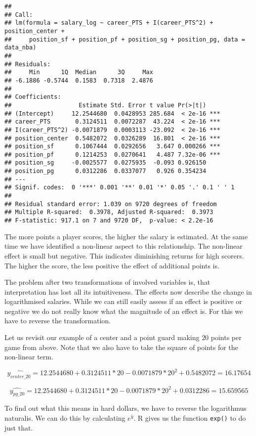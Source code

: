 \documentclass[
]{book}
\begin{document}
\begin{verbatim}
## 
## Call:
## lm(formula = salary_log ~ career_PTS + I(career_PTS^2) + position_center + 
##     position_sf + position_pf + position_sg + position_pg, data = data_nba)
## 
## Residuals:
##     Min      1Q  Median      3Q     Max 
## -6.1886 -0.5744  0.1583  0.7318  2.4876 
## 
## Coefficients:
##                   Estimate Std. Error t value Pr(>|t|)    
## (Intercept)     12.2544680  0.0428953 285.684  < 2e-16 ***
## career_PTS       0.3124511  0.0072287  43.224  < 2e-16 ***
## I(career_PTS^2) -0.0071879  0.0003113 -23.092  < 2e-16 ***
## position_center  0.5482072  0.0326289  16.801  < 2e-16 ***
## position_sf      0.1067444  0.0292656   3.647 0.000266 ***
## position_pf      0.1214253  0.0270641   4.487 7.32e-06 ***
## position_sg     -0.0025577  0.0275935  -0.093 0.926150    
## position_pg      0.0312286  0.0337077   0.926 0.354234    
## ---
## Signif. codes:  0 '***' 0.001 '**' 0.01 '*' 0.05 '.' 0.1 ' ' 1
## 
## Residual standard error: 1.039 on 9720 degrees of freedom
## Multiple R-squared:  0.3978, Adjusted R-squared:  0.3973 
## F-statistic: 917.1 on 7 and 9720 DF,  p-value: < 2.2e-16
\end{verbatim}

The more points a player scores, the higher the salary is estimated. At the same
time we have identified a non-linear aspect to this relationship. The non-linear
effect is small but negative. This indicates diminishing returns for high
scorers. The higher the score, the less positive the effect of additional points
is.

The problem after two transformations of involved variables is, that
interpretation has lost all its intuitiveness. The effects now describe the
change in logarithmised salaries. While we can still easily assess if an effect
is positive or negative we do not really know what the magnitude of an effect is.
For this we have to reverse the transformation.

Let us revisit our example of a center and a point guard making \(20\) points
per game from above. Note that we also have to take the square of points for the
non-linear term.

\[\hat{y_{center\_20}} = 12.2544680 + 0.3124511 * 20 - 0.0071879 * 20^2 + 0.5482072 = 16.17654\]

\[\hat{y_{pg\_20}} = 12.2544680 + 0.3124511 * 20 - 0.0071879 * 20^2 + 0.0312286 = 15.659565\]

To find out what this means in hard dollars, we have to reverse the logarithmus
naturalis. We can do this by calculating \(e^{\hat{y}}\). R gives us the function
\texttt{exp()} to do just that.
\end{document}
